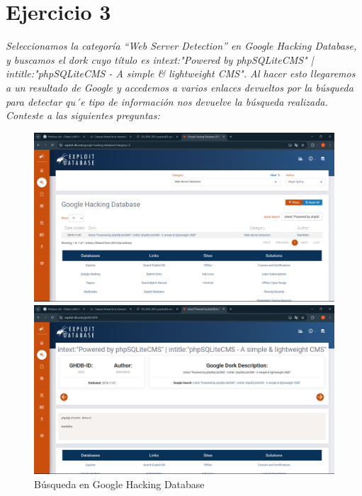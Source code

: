 \documentclass[12pt]{book}
\begin{document}
\section{Ejercicio 3}
\textit{Seleccionamos la categoría “Web Server Detection” en Google Hacking Database, y buscamos el dork cuyo título es intext:"Powered by phpSQLiteCMS" | intitle:"phpSQLiteCMS - A simple \& lightweight CMS".
Al hacer esto llegaremos a un resultado de Google y accedemos a varios enlaces
devueltos por la búsqueda para detectar qu´e tipo de información nos devuelve la
búsqueda realizada.
Conteste a las siguientes preguntas:}
\begin{figure}[h]
    \centering
    \begin{minipage}{0.45\textwidth}
        \centering
        \includegraphics[width=\textwidth]{Practica 3y4/images/Captura de pantalla (80).png}
    \end{minipage}\hfill
    \begin{minipage}{0.45\textwidth}
        \centering
        \includegraphics[width=\textwidth]{Practica 3y4/images/Captura de pantalla (81).png}
    \end{minipage}
    \caption{Búsqueda en Google Hacking Database}
\end{figure}
\end{document}
